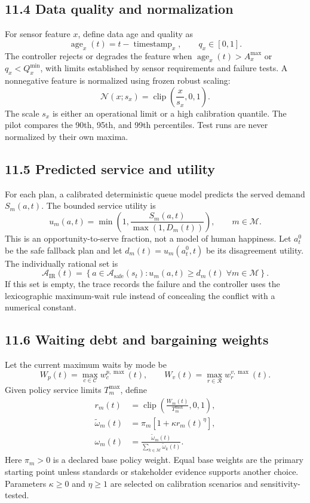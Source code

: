 \documentclass[
  english,
  11pt,
  a4paper,
]{article}
\begin{document}
\subsection{11.4 Data quality and normalization}\label{data-quality-and-normalization}

For sensor feature \(x\), define data age and quality as
\[
  \operatorname{age}_x(t)=t-\operatorname{timestamp}_x,
  \qquad q_x\in[0,1].
\]
The controller rejects or degrades the feature when
\(\operatorname{age}_x(t)>A_x^{\max}\) or \(q_x<Q_x^{\min}\), with
limits established by sensor requirements and failure tests. A
nonnegative feature is normalized using frozen robust scaling:
\[
  \mathcal{N}(x;s_x)=\operatorname{clip}\!\left(\frac{x}{s_x},0,1\right).
\]
The scale \(s_x\) is either an operational limit or a high calibration
quantile. The pilot compares the 90th, 95th, and 99th percentiles. Test
runs are never normalized by their own maxima.

\subsection{11.5 Predicted service and utility}\label{predicted-service-and-utility}

For each plan, a calibrated deterministic queue model predicts the
served demand \(S_m(a,t)\). The bounded service utility is
\[
  u_m(a,t)=\min\!\left(1,
  \frac{S_m(a,t)}{\max(1,D_m(t))}\right), \qquad m\in\mathcal{M}.
\]
This is an opportunity-to-serve fraction, not a model of human
happiness. Let \(a_t^0\) be the safe fallback plan and let
\(d_m(t)=u_m(a_t^0,t)\) be its disagreement utility. The individually
rational set is
\[
  \mathcal{A}_{\mathrm{IR}}(t)=
  \left\{a\in\mathcal{A}_{\mathrm{safe}}(s_t):
  u_m(a,t)\ge d_m(t)\;\forall m\in\mathcal{M}\right\}.
\]
If this set is empty, the trace records the failure and the controller
uses the lexicographic maximum-wait rule instead of concealing the
conflict with a numerical constant.

\subsection{11.6 Waiting debt and bargaining weights}\label{waiting-debt-and-bargaining-weights}

Let the current maximum waits by mode be
\[
  W_p(t)=\max_{c\in\mathcal{C}}w_c^{p,\max}(t), \qquad
  W_v(t)=\max_{r\in\mathcal{R}}w_r^{v,\max}(t).
\]
Given policy service limits \(T_m^{\max}\), define
\begin{align}
  r_m(t) &= \operatorname{clip}\!\left(
    \frac{W_m(t)}{T_m^{\max}},0,1\right),\\
  \widetilde{\omega}_m(t) &= \pi_m
    \left[1+\kappa r_m(t)^{\eta}\right],\\
  \omega_m(t) &= \frac{\widetilde{\omega}_m(t)}
    {\sum_{k\in\mathcal{M}}\widetilde{\omega}_k(t)}.
\end{align}
Here \(\pi_m>0\) is a declared base policy weight. Equal base weights
are the primary starting point unless standards or stakeholder evidence
supports another choice. Parameters \(\kappa\ge0\) and \(\eta\ge1\)
are selected on calibration scenarios and sensitivity-tested.
\end{document}
